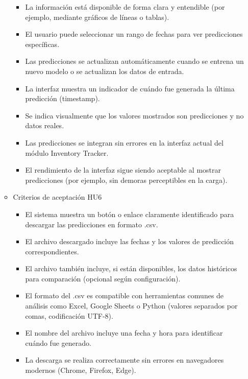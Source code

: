\documentclass[
11pt, %
]{charter}
\begin{document}
\begin{itemize}
\begin{itemize}
\begin{itemize}
      \item La información está disponible de forma clara y entendible (por ejemplo, mediante gráficos de líneas o tablas).

      \item El usuario puede seleccionar un rango de fechas para ver predicciones específicas.

      \item Las predicciones se actualizan automáticamente cuando se entrena un nuevo modelo o se actualizan los datos de entrada.

      \item La interfaz muestra un indicador de cuándo fue generada la última predicción (timestamp).

      \item Se indica visualmente que los valores mostrados son predicciones y no datos reales.

      \item Las predicciones se integran sin errores en la interfaz actual del módulo Inventory Tracker.

      \item El rendimiento de la interfaz sigue siendo aceptable al mostrar predicciones (por ejemplo, sin demoras perceptibles en la carga).
	\end{itemize}
      \item Criterios de aceptación HU6
	\begin{itemize}
      \item El sistema muestra un botón o enlace claramente identificado para descargar las predicciones en formato .csv.

      \item El archivo descargado incluye las fechas y los valores de predicción correspondientes.

      \item El archivo también incluye, si están disponibles, los datos históricos para comparación (opcional según configuración).

      \item El formato del .csv es compatible con herramientas comunes de análisis como Excel, Google Sheets o Python (valores separados por comas, codificación UTF-8).

      \item El nombre del archivo incluye una fecha y hora para identificar cuándo fue generado.

      \item La descarga se realiza correctamente sin errores en navegadores modernos (Chrome, Firefox, Edge).


\end{itemize}
\end{itemize}
\end{itemize}
\end{document}
